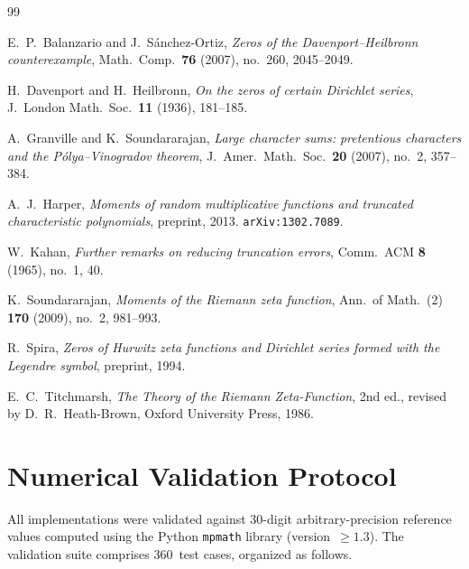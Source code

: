 \documentclass[11pt]{amsart}
\theoremstyle{definition}
\theoremstyle{remark}
\begin{document}
\begin{thebibliography}{99}

E.~P.\ Balanzario and J.~S\'anchez-Ortiz,
\emph{Zeros of the Davenport--Heilbronn counterexample},
Math.\ Comp.\ \textbf{76} (2007), no.\ 260, 2045--2049.

H.~Davenport and H.~Heilbronn,
\emph{On the zeros of certain Dirichlet series},
J.\ London Math.\ Soc.\ \textbf{11} (1936), 181--185.

A.~Granville and K.~Soundararajan,
\emph{Large character sums: pretentious characters and the
P\'olya--Vinogradov theorem},
J.\ Amer.\ Math.\ Soc.\ \textbf{20} (2007), no.\ 2, 357--384.

A.~J.\ Harper,
\emph{Moments of random multiplicative functions and truncated
characteristic polynomials},
preprint, 2013.
\texttt{arXiv:1302.7089}.

W.~Kahan,
\emph{Further remarks on reducing truncation errors},
Comm.\ ACM \textbf{8} (1965), no.~1, 40.

K.~Soundararajan,
\emph{Moments of the Riemann zeta function},
Ann.\ of Math.\ (2) \textbf{170} (2009), no.~2, 981--993.

R.~Spira,
\emph{Zeros of Hurwitz zeta functions and Dirichlet series formed
with the Legendre symbol},
preprint, 1994.

E.~C.\ Titchmarsh,
\emph{The Theory of the Riemann Zeta-Function},
2nd ed., revised by D.~R.~Heath-Brown,
Oxford University Press, 1986.

\end{thebibliography}

\appendix

\section{Numerical Validation Protocol}\label{app:validation}

All implementations were validated against 30-digit
arbitrary-precision reference values computed using the Python
\texttt{mpmath} library (version~$\ge 1.3$).  The validation suite
comprises 360~test cases, organized as follows.
\end{document}
